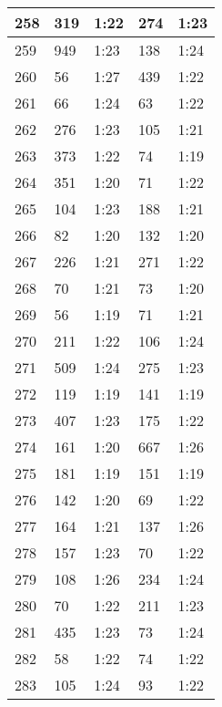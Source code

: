 \begin{center}
\begin{longtable}{|p{2cm}|l|l|l|l|}
258	&   319           &  1:22  &		274     	& 1:23 \\ \hline
259	&   949           &  1:23  &		138     	& 1:24 \\ \hline
260	&   56            &  1:27  &		439     	& 1:22 \\ \hline
261	&   66            &  1:24  &		63      	& 1:22 \\ \hline
262	&   276           &  1:23  &		105     	& 1:21 \\ \hline
263	&   373           &  1:22  &		74      	& 1:19 \\ \hline
264	&   351           &  1:20  &		71      	& 1:22 \\ \hline
265	&   104           &  1:23  &		188     	& 1:21 \\ \hline
266	&   82            &  1:20  &		132     	& 1:20 \\ \hline
267	&   226           &  1:21  &		271     	& 1:22 \\ \hline
268	&   70            &  1:21  &		73      	& 1:20 \\ \hline
269	&   56            &  1:19  &		71      	& 1:21 \\ \hline
270	&   211           &  1:22  &		106     	& 1:24 \\ \hline
271	&   509           &  1:24  &		275     	& 1:23 \\ \hline
272	&   119           &  1:19  &		141     	& 1:19 \\ \hline
273	&   407           &  1:23  &		175     	& 1:22 \\ \hline
274	&   161           &  1:20  &		667     	& 1:26 \\ \hline
275	&   181           &  1:19  &		151     	& 1:19 \\ \hline
276	&   142           &  1:20  &		69      	& 1:22 \\ \hline
277	&   164           &  1:21  &		137     	& 1:26 \\ \hline
278	&   157           &  1:23  &		70      	& 1:22 \\ \hline
279	&   108           &  1:26  &		234     	& 1:24 \\ \hline
280	&   70            &  1:22  &		211     	& 1:23 \\ \hline
281	&   435           &  1:23  &		73      	& 1:24 \\ \hline
282	&   58            &  1:22  &		74      	& 1:22 \\ \hline
283	&   105           &  1:24  &		93      	& 1:22 \\ \hline

\end{longtable}
\end{center}
